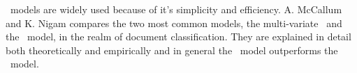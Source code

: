 	\nb\ models are widely used because of it's simplicity and efficiency. A. McCallum and K. Nigam compares the two most common models, the multi-variate \bn\ and the \mn\ model, in the realm of document classification. They are explained in detail both theoretically and empirically and in general the \mn\ model outperforms the \bn\ model. \cite{McCallum98acomparison}